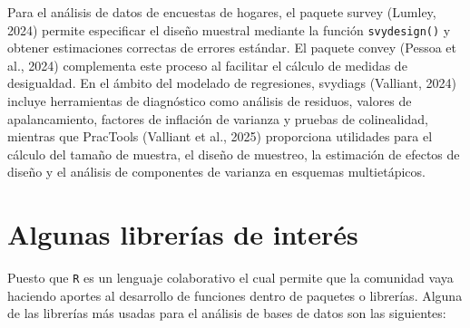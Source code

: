 \documentclass[
  spanish,
  12pt,
]{book}
\begin{document}
Para el análisis de datos de encuestas de hogares, el paquete survey (Lumley, 2024) permite especificar el diseño muestral mediante la función \texttt{svydesign()} y obtener estimaciones correctas de errores estándar. El paquete convey (Pessoa et al., 2024) complementa este proceso al facilitar el cálculo de medidas de desigualdad. En el ámbito del modelado de regresiones, svydiags (Valliant, 2024) incluye herramientas de diagnóstico como análisis de residuos, valores de apalancamiento, factores de inflación de varianza y pruebas de colinealidad, mientras que PracTools (Valliant et al., 2025) proporciona utilidades para el cálculo del tamaño de muestra, el diseño de muestreo, la estimación de efectos de diseño y el análisis de componentes de varianza en esquemas multietápicos.

\section{Algunas librerías de interés}\label{algunas-libreruxedas-de-interuxe9s}

Puesto que \texttt{R} es un lenguaje colaborativo el cual permite que la comunidad vaya haciendo aportes al desarrollo de funciones dentro de paquetes o librerías. Alguna de las librerías más usadas para el análisis de bases de datos son las siguientes:
\end{document}
